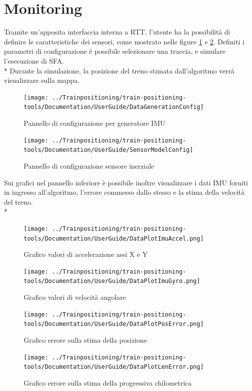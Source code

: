 \section{Monitoring}
Tramite un'apposita interfaccia interna a RTT, l'utente ha la possibilit\`a di definire le caratteristiche dei sensori, come mostrato nelle figure \ref{fig:datagenerationconfig} e \ref{fig:imuconfig}. Definiti i parametri di configurazione \`e possibile selezionare una traccia, e simulare l'esecuzione di SFA.\\* Durante la simulazione, la posizione del treno stimata dall'algoritmo verr\`a visualizzare sulla mappa. 
\begin{figure}[h]
	\centering
	\texttt{[image: ../Trainpositioning/train-positioning-tools/Documentation/UserGuide/DataGenerationConfig]}
	\caption{Pannello di configurazione per generatore IMU}
	\label{fig:datagenerationconfig}
\end{figure}
\begin{figure}[h]
	\centering
	\texttt{[image: ../Trainpositioning/train-positioning-tools/Documentation/UserGuide/SensorModelConfig]}
	\caption{Pannello di configurazione sensore inerziale}
	\label{fig:imuconfig}
\end{figure}
\newpage
Sui grafici nel pannello inferiore \`e possibile inoltre visualizzare i dati IMU forniti in ingresso all'algoritmo, l'errore commesso dallo stesso e la stima della velocit\`a del treno.\\*
\begin{figure}[h]
	\centering
	\texttt{[image: ../Trainpositioning/train-positioning-tools/Documentation/UserGuide/DataPlotImuAccel.png]}
	\caption{Grafico valori di accelerazione assi X e Y}
	\label{fig:imuxy}
\end{figure}
\begin{figure}[h]
	\centering
	\texttt{[image: ../Trainpositioning/train-positioning-tools/Documentation/UserGuide/DataPlotImuGyro.png]}
	\caption{Grafico valori di velocit\`a angolare}
	\label{fig:gyroxyz}
\end{figure}
\begin{figure}[h]
	\centering
	\texttt{[image: ../Trainpositioning/train-positioning-tools/Documentation/UserGuide/DataPlotPosError.png]}
	\caption{Grafico errore sulla stima della posizione}
	\label{fig:dataplotposerror}
\end{figure}
\begin{figure}[h]
	\centering
	\texttt{[image: ../Trainpositioning/train-positioning-tools/Documentation/UserGuide/DataPlotLenError.png]}
	\caption{Grafico errore sulla stima della progressiva chilometrica}
	\label{fig:dataplotlenerror}
\end{figure}
